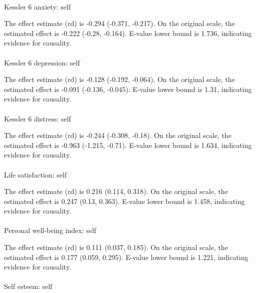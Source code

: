 \documentclass[
  single column]{article}
\makeatletter
\let\oldparagraph\paragraph
\renewcommand{\paragraph}{
    \@ifstar
      \xxxParagraphStar
      \xxxParagraphNoStar
  }
\newcommand{\xxxParagraphStar}[1]{\oldparagraph*{#1}\mbox{}}
\newcommand{\xxxParagraphNoStar}[1]{\oldparagraph{#1}\mbox{}}
\makeatother
\begin{document}
\paragraph{Kessler 6 anxiety: self}\label{kessler-6-anxiety-self-4}

The effect estimate (rd) is -0.294 (-0.371, -0.217). On the original
scale, the estimated effect is -0.222 (-0.28, -0.164). E-value lower
bound is 1.736, indicating evidence for causality.

\paragraph{Kessler 6 depression:
self}\label{kessler-6-depression-self-4}

The effect estimate (rd) is -0.128 (-0.192, -0.064). On the original
scale, the estimated effect is -0.091 (-0.136, -0.045). E-value lower
bound is 1.31, indicating evidence for causality.

\paragraph{Kessler 6 distress: self}\label{kessler-6-distress-self-3}

The effect estimate (rd) is -0.244 (-0.308, -0.18). On the original
scale, the estimated effect is -0.963 (-1.215, -0.71). E-value lower
bound is 1.634, indicating evidence for causality.

\paragraph{Life satisfaction: self}\label{life-satisfaction-self-10}

The effect estimate (rd) is 0.216 (0.114, 0.318). On the original scale,
the estimated effect is 0.247 (0.13, 0.363). E-value lower bound is
1.458, indicating evidence for causality.

\paragraph{Personal well-being index:
self}\label{personal-well-being-index-self-5}

The effect estimate (rd) is 0.111 (0.037, 0.185). On the original scale,
the estimated effect is 0.177 (0.059, 0.295). E-value lower bound is
1.221, indicating evidence for causality.

\paragraph{Self esteem: self}\label{self-esteem-self-6}
\end{document}
